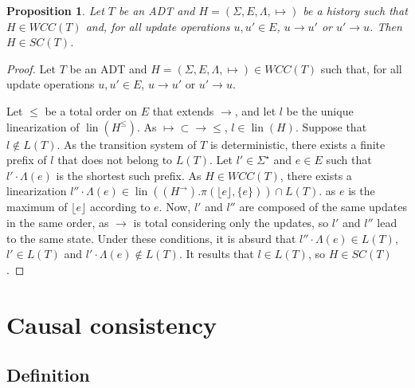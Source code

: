 \documentclass[9pt,numbers]{sigplanconf}
\newtheorem{proposition}{Proposition}
\DeclareMathOperator{\lin}{lin}
\begin{document}
\begin{proposition}\label{prop:causal:WCC_W|W}
  Let $T$ be an ADT and $H = (\Sigma, E, \Lambda, \mapsto)$ be a history such that $H \in WCC(T)$ and, for all update operations $u, u' \in E$,
  $u\rightarrow u'$ or $u'\rightarrow u$. Then $H\in SC(T)$.
\end{proposition}
\begin{proof}
  Let $T$ be an ADT and $H = (\Sigma, E, \Lambda, \mapsto) \in WCC(T)$ such that, for all update operations $u, u' \in E$,
  $u\rightarrow u'$ or $u'\rightarrow u$. 

  Let $\le$ be a total order on $E$ that extends $\rightarrow$, and let $l$ be the unique linearization
  of $\lin(H^\le)$. As $\mapsto\subset\rightarrow\le$, $l\in \lin(H)$.
  Suppose that $l\notin L(T)$. As the transition system of $T$ is deterministic, there exists a finite prefix of $l$
  that does not belong to $L(T)$. Let $l'\in \Sigma^\star$ and $e\in E$ such that $l'\cdot\Lambda(e)$ is the shortest such prefix.
  As $H\in WCC(T)$, there exists a linearization  $l''\cdot\Lambda(e) \in \lin((H^\rightarrow).\pi(\lfloor e\rfloor, \{e\}))\cap L(T)$. 
  as $e$ is the maximum of $\lfloor e\rfloor$ according to $e$.
  Now, $l'$ and $l''$ are composed of the same updates in the same order, as $\rightarrow$ is total considering only the updates, 
  so $l'$ and $l''$ lead to the same state. Under these conditions, it is absurd that $l''\cdot\Lambda(e) \in L(T)$,
  $l' \in L(T)$ and $l'\cdot\Lambda(e) \notin L(T)$. It results that $l\in L(T)$, so $H\in SC(T)$.
\end{proof}


\section{Causal consistency} \label{sec:cc}


\subsection{Definition}
\end{document}
